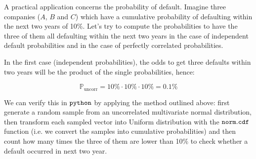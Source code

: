 A practical application concerns the probability of default. 
Imagine three companies ($A$, $B$ and $C$) which have a
cumulative probability of defaulting within the next two years of 10\%.
Let's try to compute the probabilities to have the three of them all
defaulting within the next two years in the case of independent default probabilities and in the case of perfectly correlated probabilities.

In the first case (independent probabilities), the
odds to get three defaults within two years will be the product
of the single probabilities, hence:

\[\mathbb{P}_{\mathrm{uncorr}} = 10\% \cdot 10\% \cdot 10\% = 0.1 \%\]

We can verify this in \(\tt{python}\) by applying the method outlined above: first generate a random sample from an uncorrelated multivariate normal distribution, then transform each sampled vector into Uniform distribution with the \(\tt{norm.cdf}\) function (i.e. we
convert the samples into cumulative probabilities) and then count how many times the
three of them are lower than 10\% to check whether a default occurred in next two year.

